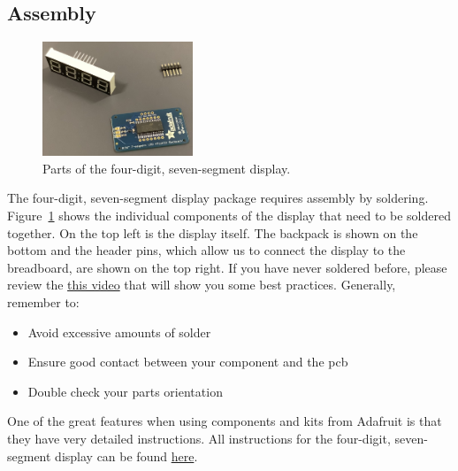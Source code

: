 \subsection{Assembly}

\begin{figure}[htb]
    \centering
    \includegraphics[width=0.4\textwidth]{graphics/02_display/7seg_adafruit_unpacked.jpg}
    \caption{Parts of the four-digit, seven-segment display.}
    \label{fig:display:7seg_unpacked}
\end{figure}
The four-digit, seven-segment display package requires assembly by soldering. Figure~\ref{fig:display:7seg_unpacked} shows the individual components of the display that need to be soldered together. On the top left is the display itself. The backpack is shown on the bottom and the header pins, which allow us to connect the display to the breadboard, are shown on the top right. If you have never soldered before, please review the \href{https://www.youtube.com/watch?v=AqvHogekDI4}{this video} that will show you some best practices. Generally, remember to:
\begin{itemize}
    \item Avoid excessive amounts of solder
    \item Ensure good contact between your component and the \ac{pcb}
    \item Double check your parts orientation
\end{itemize}


One of the great features when using components and kits from Adafruit is that they have very detailed instructions. All instructions for the four-digit, seven-segment display can be found \href{https://learn.adafruit.com/adafruit-led-backpack/0-dot-56-seven-segment-backpack}{here}.

